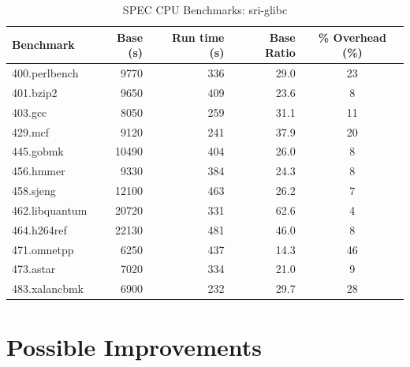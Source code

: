 \documentclass[twoside,12pt]{cslreport}
\begin{document}
\begin{table}
\begin{center}
\begin{tabular}{|l|r|r|r|c|}
\hline
Benchmark  & Base  (s)  & Run time (s) &  Base Ratio & \% Overhead (\%)\\
\hline
400.perlbench   &  9770        &  336       &  29.0 & 23 \\
401.bzip2       &  9650        &  409       &  23.6 & 8  \\
403.gcc         &  8050        &  259       &  31.1 & 11 \\
429.mcf         &  9120        &  241       &  37.9 & 20 \\
445.gobmk       &  10490       &   404      &  26.0 & 8  \\
456.hmmer       &   9330       &   384      &  24.3 & 8  \\
458.sjeng       &  12100       &   463      &  26.2 & 7  \\
462.libquantum  &  20720       &   331      &  62.6 & 4  \\
464.h264ref     &  22130       &   481      &  46.0 & 8  \\
471.omnetpp     &   6250       &   437      &  14.3 & 46 \\
473.astar       &   7020       &   334      &  21.0 & 9  \\
483.xalancbmk   &   6900       &   232      &  29.7 & 28 \\
\hline
\end{tabular}
\end{center}
\caption{SPEC CPU Benchmarks: sri-glibc}
\label{sri-glibc:spec}
\end{table}



\section{Possible Improvements}
\end{document}
